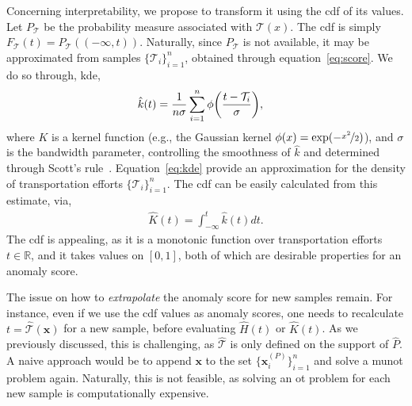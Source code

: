 Concerning interpretability, we propose to transform it using the \gls{cdf} of its values. Let $P_{\mathcal{T}}$ be the probability measure associated with $\mathcal{T}(x)$. The \gls{cdf} is simply $F_{\mathcal{T}}(t) = P_{\mathcal{T}}((-\infty, t))$. Naturally, since $P_{\mathcal{T}}$ is not available, it may be approximated from samples $\{\mathcal{T}_{i}\}_{i=1}^{n}$, obtained through equation~\ref{eq:score}. We do so through, \gls{kde},
\begin{align}
    \hat{k}(t) &= \dfrac{1}{n\sigma}\sum_{i=1}^{n}\phi\biggr{(}\dfrac{t-\mathcal{T}_{i}}{\sigma}\biggr{)},\label{eq:kde}
\end{align}
where $K$ is a kernel function (e.g., the Gaussian kernel $\phi(x) = \exp(-\nicefrac{x^{2}}{2})$), and $\sigma$ is the bandwidth parameter, controlling the smoothness of $\hat{k}$ and determined through Scott's rule~\citep{scott1979optimal}. Equation~\ref{eq:kde} provide an approximation for the density of transportation efforts $\{\mathcal{T}_{i}\}_{i=1}^{n}$. The \gls{cdf} can be easily calculated from this estimate, via,
\begin{align}
    \hat{K}(t)=\int_{-\infty}^{t}\hat{k}(t)dt.\label{eq:cdf}
\end{align}
The \gls{cdf} is appealing, as it is a monotonic function over transportation efforts $t \in \mathbb{R}$, and it takes values on $[0, 1]$, both of which are desirable properties for an anomaly score.

The issue on how to \emph{extrapolate} the anomaly score for new samples remain. For instance, even if we use the \gls{cdf} values as anomaly scores, one needs to recalculate $t = \hat{\mathcal{T}}(\mathbf{x})$ for a new sample, before evaluating $\hat{H}(t)$ or $\hat{K}(t)$. As we previously discussed, this is challenging, as $\hat{\mathcal{T}}$ is only defined on the support of $\hat{P}$. A naive approach would be to append $\mathbf{x}$ to the set $\{\mathbf{x}_{i}^{(P)}\}_{i=1}^{n}$ and solve a \gls{munot} problem again. Naturally, this is not feasible, as solving an \gls{ot} problem for each new sample is computationally expensive.

